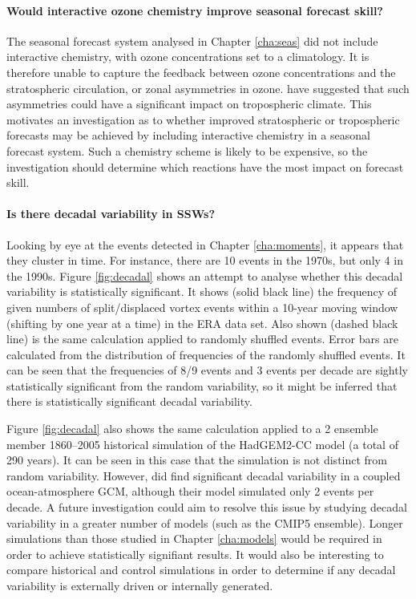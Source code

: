 \paragraph{Would interactive ozone chemistry improve seasonal forecast skill?}
The seasonal forecast system analysed in Chapter \ref{cha:seas} did not include
interactive chemistry, with ozone concentrations set to a climatology. It is
therefore unable to capture the feedback between ozone concentrations and the
stratospheric circulation, or zonal asymmetries in ozone. \citet{Waugh2009} have
suggested that such asymmetries could have a significant impact on tropospheric
climate. This motivates an investigation as to whether improved stratospheric or
tropospheric forecasts may be achieved by including interactive chemistry in a
seasonal forecast system. Such a chemistry scheme is likely to be expensive, so
the investigation should determine which reactions have the most impact on
forecast skill.


\paragraph{Is there decadal variability in SSWs?} Looking by eye at the events
detected in Chapter \ref{cha:moments}, it appears that they cluster in time. For
instance, there are 10 events in the 1970s, but only 4 in the 1990s. Figure
\ref{fig:decadal} shows an attempt to analyse whether this decadal variability
is statistically significant. It shows (solid black line) the frequency of given
numbers of split/displaced vortex events within a 10-year moving window
(shifting by one year at a time) in the ERA data set. Also shown (dashed black
line) is the same calculation applied to randomly shuffled events. Error bars
are calculated from the distribution of frequencies of the randomly shuffled
events. It can be seen that the frequencies of 8/9 events and 3 events per
decade are sightly statistically significant from the random variability, so it
might be inferred that there is statistically significant decadal variability.

Figure \ref{fig:decadal} also shows the same calculation applied to a 2 ensemble
member 1860--2005 historical simulation of the HadGEM2-CC model (a total of 290
years). It can be seen in this case that the simulation is not distinct from
random variability. However, \citet{Schimanke2011} did find significant decadal
variability in a coupled ocean-atmosphere GCM, although their model simulated
only 2 events per decade. A future investigation could aim to resolve this issue
by studying decadal variability in a greater number of models (such as the CMIP5
ensemble). Longer simulations than those studied in Chapter \ref{cha:models}
would be required in order to achieve statistically signifiant results. It would
also be interesting to compare historical and control simulations in order to
determine if any decadal variability is externally driven or internally
generated.


